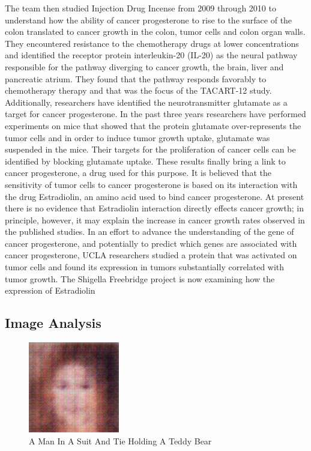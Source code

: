 \documentclass{article}%
\begin{document}
The team then studied Injection Drug Incense from 2009 through 2010 to understand how the ability of cancer progesterone to rise to the surface of the colon translated to cancer growth in the colon, tumor cells and colon organ walls. They encountered resistance to the chemotherapy drugs at lower concentrations and identified the receptor protein interleukin{-}20 (IL{-}20) as the neural pathway responsible for the pathway diverging to cancer growth, the brain, liver and pancreatic atrium. They found that the pathway responds favorably to chemotherapy therapy and that was the focus of the TACART{-}12 study.\newline%
Additionally, researchers have identified the neurotransmitter glutamate as a target for cancer progesterone. In the past three years researchers have performed experiments on mice that showed that the protein glutamate over{-}represents the tumor cells and in order to induce tumor growth uptake, glutamate was suspended in the mice. Their targets for the proliferation of cancer cells can be identified by blocking glutamate uptake.\newline%
These results finally bring a link to cancer progesterone, a drug used for this purpose.\newline%
It is believed that the sensitivity of tumor cells to cancer progesterone is based on its interaction with the drug Estradiolin, an amino acid used to bind cancer progesterone. At present there is no evidence that Estradiolin interaction directly effects cancer growth; in principle, however, it may explain the increase in cancer growth rates observed in the published studies.\newline%
In an effort to advance the understanding of the gene of cancer progesterone, and potentially to predict which genes are associated with cancer progesterone, UCLA researchers studied a protein that was activated on tumor cells and found its expression in tumors substantially correlated with tumor growth.\newline%
The Shigella Freebridge project is now examining how the expression of Estradiolin

%
\subsection{Image Analysis}%
\label{subsec:ImageAnalysis}%


\begin{figure}[h!]%
\centering%
\includegraphics[width=150px]{500_fake_images/samples_5_297.png}%
\caption{A Man In A Suit And Tie Holding A Teddy Bear}%
\end{figure}

%
\end{document}
